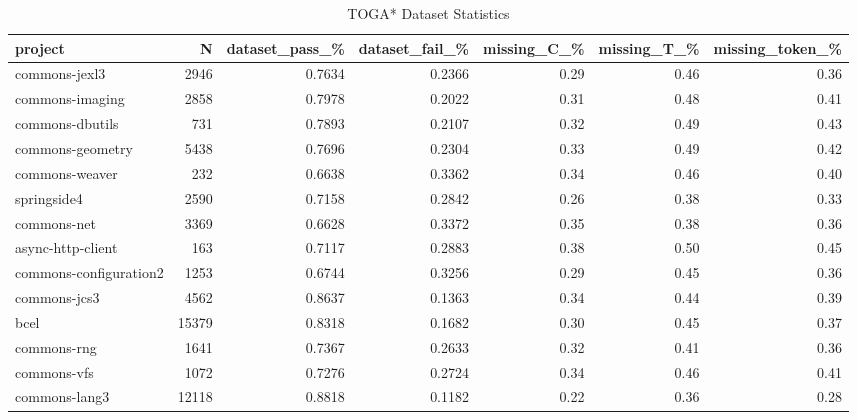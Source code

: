 \begin{table}
\centering
\caption{TOGA* Dataset Statistics}
\label{tab:toga_stats_all}
\begin{tabular}{lrrrrrr}
\toprule
                project &       N &  dataset\_pass\_\% &  dataset\_fail\_\% &  missing\_C\_\% &  missing\_T\_\% &  missing\_token\_\% \\
\midrule
          commons-jexl3 &    2946 &          0.7634 &          0.2366 &         0.29 &         0.46 &             0.36 \\
        commons-imaging &    2858 &          0.7978 &          0.2022 &         0.31 &         0.48 &             0.41 \\
        commons-dbutils &     731 &          0.7893 &          0.2107 &         0.32 &         0.49 &             0.43 \\
       commons-geometry &    5438 &          0.7696 &          0.2304 &         0.33 &         0.49 &             0.42 \\
         commons-weaver &     232 &          0.6638 &          0.3362 &         0.34 &         0.46 &             0.40 \\
            springside4 &    2590 &          0.7158 &          0.2842 &         0.26 &         0.38 &             0.33 \\
            commons-net &    3369 &          0.6628 &          0.3372 &         0.35 &         0.38 &             0.36 \\
      async-http-client &     163 &          0.7117 &          0.2883 &         0.38 &         0.50 &             0.45 \\
 commons-configuration2 &    1253 &          0.6744 &          0.3256 &         0.29 &         0.45 &             0.36 \\
           commons-jcs3 &    4562 &          0.8637 &          0.1363 &         0.34 &         0.44 &             0.39 \\
                   bcel &   15379 &          0.8318 &          0.1682 &         0.30 &         0.45 &             0.37 \\
            commons-rng &    1641 &          0.7367 &          0.2633 &         0.32 &         0.41 &             0.36 \\
            commons-vfs &    1072 &          0.7276 &          0.2724 &         0.34 &         0.46 &             0.41 \\
          commons-lang3 &   12118 &          0.8818 &          0.1182 &         0.22 &         0.36 &             0.28 \\

\end{tabular}
\end{table}
